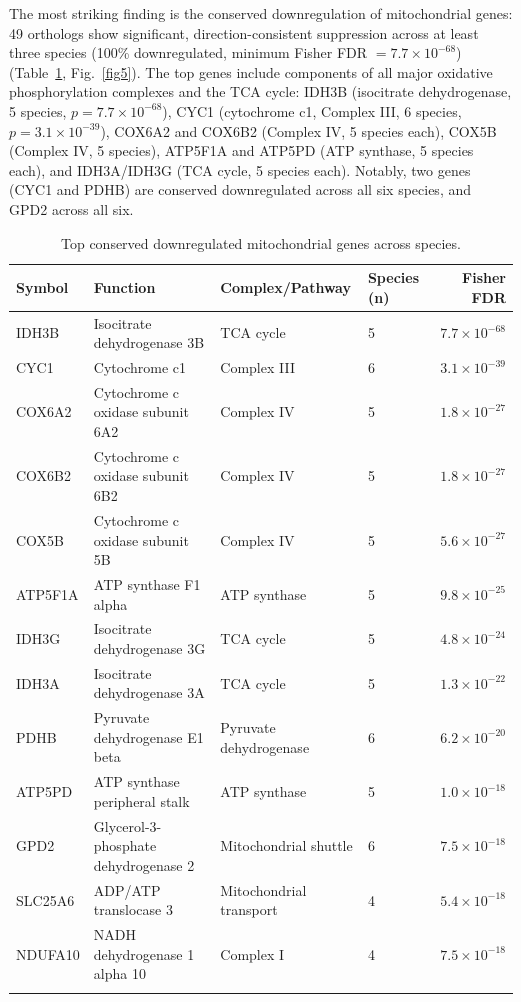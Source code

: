 \documentclass[pdflatex,sn-nature]{sn-jnl}
\begin{document}
The most striking finding is the conserved downregulation of mitochondrial genes:
49 orthologs show significant, direction-consistent suppression across at least
three species (100\% downregulated, minimum Fisher FDR \(= 7.7 \times 10^{-68}\))
(Table~\ref{tab1}, Fig.~\ref{fig5}). The top genes include components of all major
oxidative phosphorylation complexes and the TCA cycle: IDH3B (isocitrate
dehydrogenase, 5 species, \(p = 7.7 \times 10^{-68}\)), CYC1 (cytochrome c1,
Complex III, 6 species, \(p = 3.1 \times 10^{-39}\)), COX6A2 and COX6B2 (Complex
IV, 5 species each), COX5B (Complex IV, 5 species), ATP5F1A and ATP5PD (ATP
synthase, 5 species each), and IDH3A/IDH3G (TCA cycle, 5 species each). Notably,
two genes (CYC1 and PDHB) are conserved downregulated across all six species, and
GPD2 across all six.

\begin{table}[htbp]
\centering
\caption{Top conserved downregulated mitochondrial genes across species.}
\label{tab1}
\begin{tabular}{@{}llll r@{}}
\toprule
\textbf{Symbol} & \textbf{Function} & \textbf{Complex/Pathway} & \textbf{Species (n)} & \textbf{Fisher FDR} \\
\midrule
IDH3B   & Isocitrate dehydrogenase 3B     & TCA cycle              & 5 & \(7.7\times10^{-68}\) \\
CYC1    & Cytochrome c1                   & Complex III            & 6 & \(3.1\times10^{-39}\) \\
COX6A2  & Cytochrome c oxidase subunit 6A2 & Complex IV            & 5 & \(1.8\times10^{-27}\) \\
COX6B2  & Cytochrome c oxidase subunit 6B2 & Complex IV            & 5 & \(1.8\times10^{-27}\) \\
COX5B   & Cytochrome c oxidase subunit 5B & Complex IV             & 5 & \(5.6\times10^{-27}\) \\
ATP5F1A & ATP synthase F1 alpha           & ATP synthase           & 5 & \(9.8\times10^{-25}\) \\
IDH3G   & Isocitrate dehydrogenase 3G     & TCA cycle              & 5 & \(4.8\times10^{-24}\) \\
IDH3A   & Isocitrate dehydrogenase 3A     & TCA cycle              & 5 & \(1.3\times10^{-22}\) \\
PDHB    & Pyruvate dehydrogenase E1 beta  & Pyruvate dehydrogenase & 6 & \(6.2\times10^{-20}\) \\
ATP5PD  & ATP synthase peripheral stalk   & ATP synthase           & 5 & \(1.0\times10^{-18}\) \\
GPD2    & Glycerol-3-phosphate dehydrogenase 2 & Mitochondrial shuttle & 6 & \(7.5\times10^{-18}\) \\
SLC25A6 & ADP/ATP translocase 3           & Mitochondrial transport & 4 & \(5.4\times10^{-18}\) \\
NDUFA10 & NADH dehydrogenase 1 alpha 10   & Complex I              & 4 & \(7.5\times10^{-18}\) \\
\botrule
\end{tabular}
\end{table}
\end{document}
